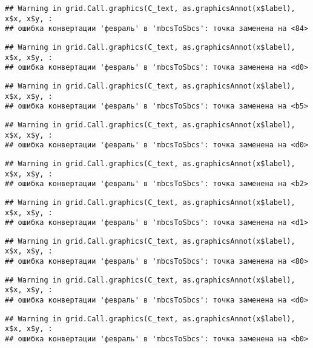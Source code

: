 \documentclass[
]{article}
\begin{document}
\begin{verbatim}
## Warning in grid.Call.graphics(C_text, as.graphicsAnnot(x$label), x$x, x$y, :
## ошибка конвертации 'февраль' в 'mbcsToSbcs': точка заменена на <84>
\end{verbatim}

\begin{verbatim}
## Warning in grid.Call.graphics(C_text, as.graphicsAnnot(x$label), x$x, x$y, :
## ошибка конвертации 'февраль' в 'mbcsToSbcs': точка заменена на <d0>
\end{verbatim}

\begin{verbatim}
## Warning in grid.Call.graphics(C_text, as.graphicsAnnot(x$label), x$x, x$y, :
## ошибка конвертации 'февраль' в 'mbcsToSbcs': точка заменена на <b5>
\end{verbatim}

\begin{verbatim}
## Warning in grid.Call.graphics(C_text, as.graphicsAnnot(x$label), x$x, x$y, :
## ошибка конвертации 'февраль' в 'mbcsToSbcs': точка заменена на <d0>
\end{verbatim}

\begin{verbatim}
## Warning in grid.Call.graphics(C_text, as.graphicsAnnot(x$label), x$x, x$y, :
## ошибка конвертации 'февраль' в 'mbcsToSbcs': точка заменена на <b2>
\end{verbatim}

\begin{verbatim}
## Warning in grid.Call.graphics(C_text, as.graphicsAnnot(x$label), x$x, x$y, :
## ошибка конвертации 'февраль' в 'mbcsToSbcs': точка заменена на <d1>
\end{verbatim}

\begin{verbatim}
## Warning in grid.Call.graphics(C_text, as.graphicsAnnot(x$label), x$x, x$y, :
## ошибка конвертации 'февраль' в 'mbcsToSbcs': точка заменена на <80>
\end{verbatim}

\begin{verbatim}
## Warning in grid.Call.graphics(C_text, as.graphicsAnnot(x$label), x$x, x$y, :
## ошибка конвертации 'февраль' в 'mbcsToSbcs': точка заменена на <d0>
\end{verbatim}

\begin{verbatim}
## Warning in grid.Call.graphics(C_text, as.graphicsAnnot(x$label), x$x, x$y, :
## ошибка конвертации 'февраль' в 'mbcsToSbcs': точка заменена на <b0>
\end{verbatim}
\end{document}
